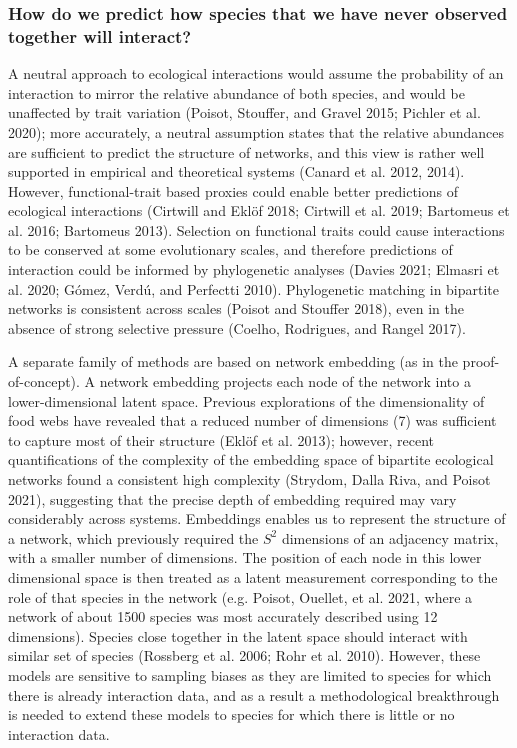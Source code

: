 \documentclass[10pt,oneside]{article}
\begin{document}
\hypertarget{how-do-we-predict-how-species-that-we-have-never-observed-together-will-interact}{%
\subsubsection{How do we predict how species that we have never observed
together will
interact?}\label{how-do-we-predict-how-species-that-we-have-never-observed-together-will-interact}}

A neutral approach to ecological interactions would assume the
probability of an interaction to mirror the relative abundance of both
species, and would be unaffected by trait variation (Poisot, Stouffer,
and Gravel 2015; Pichler et al. 2020); more accurately, a neutral
assumption states that the relative abundances are sufficient to predict
the structure of networks, and this view is rather well supported in
empirical and theoretical systems (Canard et al. 2012, 2014). However,
functional-trait based proxies could enable better predictions of
ecological interactions (Cirtwill and Eklöf 2018; Cirtwill et al. 2019;
Bartomeus et al. 2016; Bartomeus 2013). Selection on functional traits
could cause interactions to be conserved at some evolutionary scales,
and therefore predictions of interaction could be informed by
phylogenetic analyses (Davies 2021; Elmasri et al. 2020; Gómez, Verdú,
and Perfectti 2010). Phylogenetic matching in bipartite networks is
consistent across scales (Poisot and Stouffer 2018), even in the absence
of strong selective pressure (Coelho, Rodrigues, and Rangel 2017).

A separate family of methods are based on network embedding (as in the
proof-of-concept). A network embedding projects each node of the network
into a lower-dimensional latent space. Previous explorations of the
dimensionality of food webs have revealed that a reduced number of
dimensions (7) was sufficient to capture most of their structure (Eklöf
et al. 2013); however, recent quantifications of the complexity of the
embedding space of bipartite ecological networks found a consistent high
complexity (Strydom, Dalla Riva, and Poisot 2021), suggesting that the
precise depth of embedding required may vary considerably across
systems. Embeddings enables us to represent the structure of a network,
which previously required the \(S^2\) dimensions of an adjacency matrix,
with a smaller number of dimensions. The position of each node in this
lower dimensional space is then treated as a latent measurement
corresponding to the role of that species in the network (e.g. Poisot,
Ouellet, et al. 2021, where a network of about 1500 species was most
accurately described using 12 dimensions). Species close together in the
latent space should interact with similar set of species (Rossberg et
al. 2006; Rohr et al. 2010). However, these models are sensitive to
sampling biases as they are limited to species for which there is
already interaction data, and as a result a methodological breakthrough
is needed to extend these models to species for which there is little or
no interaction data.
\end{document}
